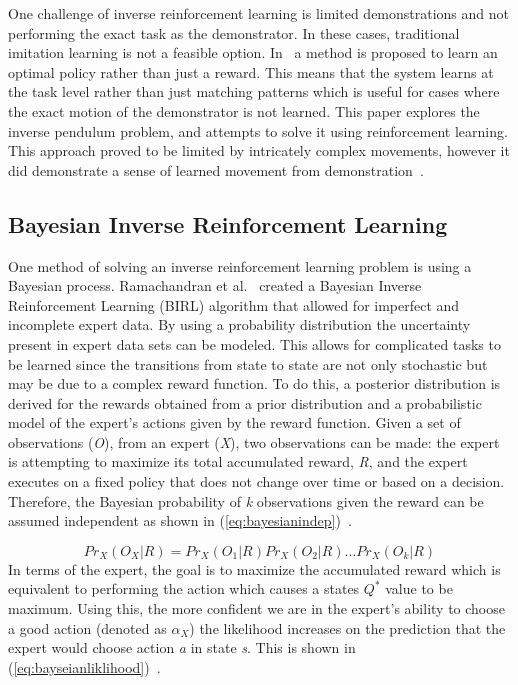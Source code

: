 \documentclass[12pt,american]{report}
\begin{document}
		One challenge of inverse reinforcement learning is limited demonstrations and not performing the exact task as the demonstrator. In these cases, traditional imitation learning is not a feasible option. In~\cite{atkeson1997robot} a method is proposed to learn an optimal policy rather than just a reward. This means that the system learns at the task level rather than just matching patterns which is useful for cases where the exact motion of the demonstrator is not learned. This paper explores the inverse pendulum problem, and attempts to solve it using reinforcement learning. This approach proved to be limited by intricately complex movements, however it did demonstrate a sense of learned movement from demonstration~\cite{atkeson1997robot}.

\subsection{Bayesian Inverse Reinforcement Learning}
One method of solving an inverse reinforcement learning problem is using a Bayesian process. Ramachandran et al.~\cite{ramachandran2007bayesian} created a Bayesian Inverse Reinforcement Learning (BIRL) algorithm that allowed for imperfect and incomplete expert data.  By using a probability distribution the uncertainty present in expert data sets can be modeled. This allows for complicated tasks to be learned since the transitions from state to state are not only stochastic but may be due to a complex reward function. To do this, a posterior distribution is derived for the rewards obtained from a prior distribution and a probabilistic model of the expert's actions given by the reward function.  Given a set of observations (\textit{O}), from an expert (\textit{X}), two observations can be made: the expert is attempting to maximize its total accumulated reward, \textit{R}, and the expert executes on a fixed policy that does not change over time or based on a decision. Therefore, the Bayesian probability of \textit{k} observations given the reward can be assumed independent as shown in (\ref{eq:bayesianindep})~\cite{ramachandran2007bayesian}.

\begin{equation}
            \label{eq:bayesianindep}
            Pr_X(O_X|R) = Pr_X(O_1|R)Pr_X(O_2|R)...Pr_X(O_k|R)%
        \end{equation}
In terms of the expert, the goal is to maximize the accumulated reward which is equivalent to performing the action which causes a states \textit{$Q^*$} value to be maximum. Using this, the more confident we are in the expert's ability to choose a good action (denoted as $\alpha_X$) the likelihood increases on the prediction that the expert would choose action \textit{a} in state \textit{s}.  This is shown in (\ref{eq:bayseianliklihood})~\cite{ramachandran2007bayesian}.
\end{document}
